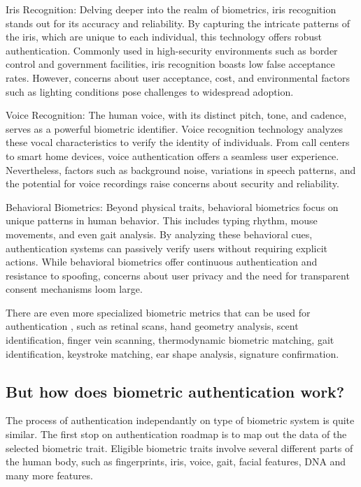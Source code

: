 Iris Recognition:
Delving deeper into the realm of biometrics, iris recognition stands out for its 
accuracy and reliability. By capturing the intricate patterns of the iris, which 
are unique to each individual, this technology offers robust authentication. 
Commonly used in high-security environments such as border control and government 
facilities, iris recognition boasts low false acceptance rates. However, concerns 
about user acceptance, cost, and environmental factors such as lighting conditions
 pose challenges to widespread adoption.

Voice Recognition:
The human voice, with its distinct pitch, tone, and cadence, serves as a 
powerful biometric identifier. Voice recognition technology analyzes these vocal 
characteristics to verify the identity of individuals. From call centers to smart
 home devices, voice authentication offers a seamless user experience. Nevertheless, 
 factors such as background noise, variations in speech patterns, and the potential 
 for voice recordings raise concerns about security and reliability.

Behavioral Biometrics:
Beyond physical traits, behavioral biometrics focus on unique patterns in human 
behavior. This includes typing rhythm, mouse movements, and even gait analysis. 
By analyzing these behavioral cues, authentication systems can passively verify 
users without requiring explicit actions. While behavioral biometrics offer 
continuous authentication and resistance to spoofing, concerns about user privacy 
and the need for transparent consent mechanisms loom large.

There are even more specialized biometric metrics that can be used for authentication
, such as retinal scans, hand geometry analysis, scent identification, finger vein scanning,
thermodynamic biometric matching, gait identification, keystroke matching, ear shape analysis,
signature confirmation.

\subsection{But how does biometric authentication work?}

\hspace{1 em} The process of authentication independantly on type of biometric system is quite 
similar. The first stop on authentication roadmap is to map out the data of the selected
biometric trait. Eligible biometric traits involve several different parts of the human
body, such as fingerprints, iris, voice, gait, facial features, DNA and many more features.

